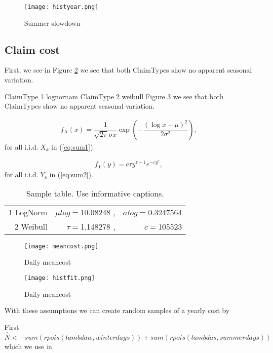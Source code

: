 \documentclass[11pt]{article}
\begin{document}
 \begin{figure}[H]
 \center
  \texttt{[image: histyear.png]}
  \caption{Summer slowdown}
  \label{fig:samplefig1}
\end{figure}


\subsection*{Claim cost}
First,  we see in Figure \ref{fig:samplefig2} we see that both ClaimTypes show no apparent seasonal variation.

ClaimType 1 lognornam
ClaimType 2 weibull
 Figure \ref{fig:samplefig3} we see that both ClaimTypes show no apparent seasonal variation.

\begin{align}\label{eq:N}
	f_{X}(x) = \dfrac{1}{\sqrt{2\pi}\sigma x} \exp\left(-\dfrac{(\log x - \mu)^2}{2\sigma^2}\right) , 
\end{align}
for all i.i.d. $X_k$ in (\ref{eq:sum1}).

\begin{align}\label{eq:N}
	f_{Y}(y) = c \tau y^{\tau - 1}e^{-cy^\tau} , 
\end{align}
for all i.i.d. $Y_k$ in (\ref{eq:sum2}).

\begin{table}[!ht]
\center
\begin{tabular}{|r|rr|}
\hline
1 LogNorm & $\mu log=$10.08248 ,& $\sigma log=$0.3247564 \\
2 Weibull & $\tau=$1.148278 ,& $c=$105523\\
\hline
\end{tabular}
\caption{Sample table. Use informative captions.} \label{tab:cost}
\end{table}

 \begin{figure}[H]
 \center
  \texttt{[image: meancost.png]}
  \caption{Daily meancost}
  \label{fig:samplefig2}
\end{figure}

 \begin{figure}[H]
 \center
  \texttt{[image: histfit.png]}
  \caption{Daily meancost}
  \label{fig:samplefig3}
\end{figure}

With these assumptions we can 
 create random samples of a yearly cost by

First $\hat{N} <-  sum(rpois(lambdaw,winterdays)) +  sum(rpois(lambdas,summerdays))$
which we use in
\end{document}
